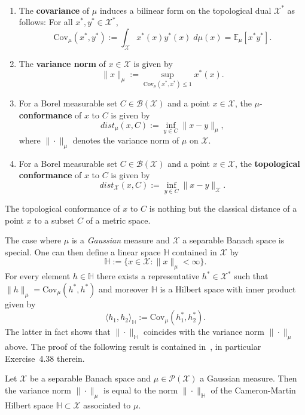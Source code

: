 \documentclass[twoside,11pt]{article}
\numberwithin{equation}{section}
\numberwithin{theorem}{section}
\newcommand{\X}{\mathcal{X}}
\newcommand{\ex}{\mathbb{E}}
\newcommand{\Hh}{\mathbb{H}}
\begin{document}
 \begin{definition}\label{def:variance_norm}\ 
 \begin{enumerate}
 \item The \textbf{covariance} of $\mu$ induces a bilinear form on the topological dual $\X^*$ as follows:
 For all $x^*, y^*\in\X^*$,
 $$
 \mathrm{Cov}_\mu(x^*, y^*):=\int_{\X}x^*(x) y^*(x)\;d\mu(x)=\ex_\mu[x^*y^*].
 $$
 \item The \textbf{variance norm} of $x\in\X$ is given by
     $$\| x\|_{\mu}:= \sup_{\mathrm{Cov}_\mu(x^*, x^*)\leq 1} x^*(x).$$

\item For a Borel measurable set $C\in\mathscr{B}(\X)$ and a point $x\in\X$, the $\mu$-\textbf{conformance} of 
  $x$ to $C$ is given by
  \begin{equation*}
      dist_\mu(x, C) := \inf_{y\in C}\|x-y\|_{\mu},
  \end{equation*}
  where $\|\cdot\|_{\mu}$ denotes the variance norm of $\mu$ on $\X$.
  \item For a Borel measurable set $C\in\mathscr{B}(\X)$ and a point $x\in\X$, the \textbf{topological conformance} of 
  $x$ to $C$ is given by
  \begin{equation*}
      dist_{\X}(x, C) := \inf_{y\in C}\|x-y\|_{\X}.
  \end{equation*}
  \end{enumerate}
   \end{definition}
   \begin{remark}
       The topological conformance of $x$ to $C$ is nothing but the classical distance of a point $x$ to a subset $C$ of a metric space. 
   \end{remark}

\noindent The case where $\mu$ is a \textit{Gaussian} measure and $\X$ a separable Banach space is special. One can then define a linear space $\Hh$ contained in $\X$ by
$$
\Hh:=\big\{ x\in\X : \|x\|_{\mu}<\infty \big\}.
$$
For every element $h\in\Hh$ there exists a representative $h^*\in\X^*$ such that $\|h\|_{\mu}=\mathrm{Cov}_\mu(h^*, h^*)$ and moreover $\Hh$ is a Hilbert space with inner product given by 
$$\langle h_1, h_2\rangle_\Hh:=\mathrm{Cov}_{\mu}(h_1^*, h_2^*).$$
The latter in fact shows that $\|\cdot\|_{\Hh}$ coincides with the variance norm $\|\cdot\|_{\mu}$ above. 
The proof of the following result is contained in~\cite[Section 4.2]{hairer2009introduction}, 
in particular Exercise~4.38 therein. 
\begin{proposition} Let $\X$ be a separable Banach space and $\mu\in\mathscr{P}(\X)$ a Gaussian measure. Then the variance norm $\|\cdot\|_{\mu}$ is equal to the norm $\|\cdot\|_{\Hh}$ of the Cameron-Martin Hilbert space $\Hh \subset\X$ associated to $\mu$.  
\end{proposition}
\end{document}
